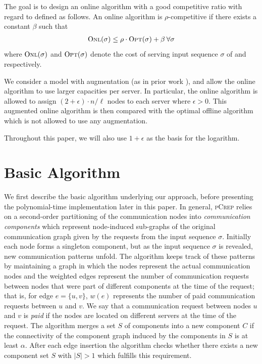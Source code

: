 \documentclass[a4paper,UKenglish,cleveref, autoref, thm-restate,authorcolumns]{lipics-v2019}
\newcommand{\adjDel}{\textsc{pCrep}}
\newcommand{\opt}{\text{O{\scriptsize PT}}}
\newcommand{\onl}{\text{O{\scriptsize NL}}}
\begin{document}
The goal is to design an online algorithm \onl{} with a good competitive ratio with regard to \opt{} defined as follows.
An online algorithm \onl{} is $\rho$-competitive if there exists a constant $\beta$ such that 
\begin{align*}
\onl{}(\sigma)\leq\rho\cdot \opt{}(\sigma)+\beta\:\forall \sigma
\end{align*} 
where $\onl{}(\sigma)$ and $\opt{}(\sigma)$ denote the cost of serving input sequence $\sigma$ of \onl{} and \opt{} respectively.

We consider a model with augmentation (as in prior work \cite{Avin2016}),
and allow the online algorithm to use larger capacities per server. 
In particular, the online algorithm is allowed to assign $(2+\epsilon)\cdot n/\ell$ nodes to each server where $\epsilon>0$. 
This augmented online algorithm is then compared with the optimal offline algorithm \opt{} which is not allowed to use any augmentation.

Throughout this paper, 
we will also use $1+\epsilon$ as the basis for the logarithm.

\section{Basic Algorithm}
\label{algIdeas}

We first describe the basic algorithm underlying
our approach, before presenting the polynomial-time implementation
later in this paper.
In general, \adjDel{} relies on a second-order partitioning of the communication nodes into \textit{communication components} which represent node-induced sub-graphs of the original communication graph given by the requests from the input sequence $\sigma$. 
Initially each node forms a singleton component, but as the input sequence $\sigma$ is revealed, new communication patterns unfold. The algorithm keeps track of these patterns by maintaining a graph in which the nodes represent the actual communication nodes and the weighted edges represent the number of communication requests between nodes that were part of different components at the time of the request; that is, 
for edge $e=\{u,v\}$, $w(e)$ represents the number of paid communication requests between $u$ and $v$. We say that a communication request between nodes $u$ and $v$ is \textit{paid} if the nodes are located on different servers at the time of the request.
The algorithm merges a set $S$ of components into a new component $C$ if the connectivity of the component graph induced by the components in $S$ is at least $\alpha$. After each edge insertion the algorithm checks whether there exists a new component set $S$ with $|S|>1$ which fulfills this requirement.
\end{document}

